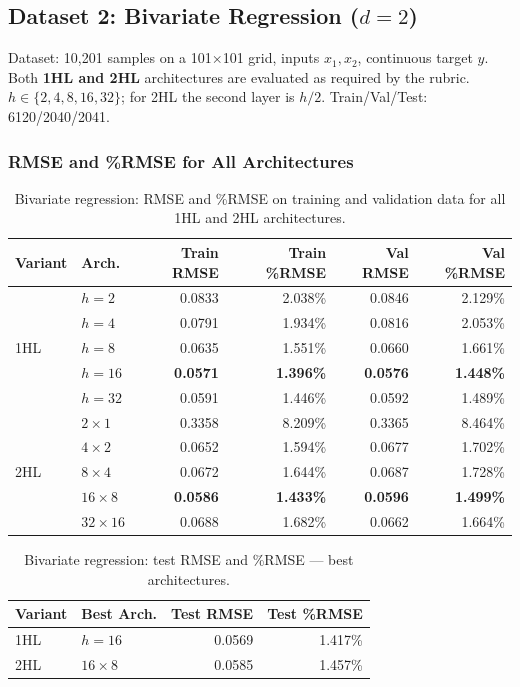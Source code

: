 \documentclass[11pt,a4paper]{article}
\begin{document}
\subsection{Dataset 2: Bivariate Regression ($d=2$)}

Dataset: 10,201 samples on a 101$\times$101 grid, inputs $x_1,x_2$, continuous target $y$. Both \textbf{1HL and 2HL} architectures are evaluated as required by the rubric. $h \in \{2,4,8,16,32\}$; for 2HL the second layer is $h/2$. Train/Val/Test: 6120/2040/2041.

\subsubsection*{RMSE and \%RMSE for All Architectures}

\begin{table}[H]
\centering
\caption{Bivariate regression: RMSE and \%RMSE on training and validation data for all 1HL and 2HL architectures.}
\label{tab:biv-trainval}
\small
\begin{tabular}{llrrrr}
\toprule
Variant & Arch. & Train RMSE & Train \%RMSE & Val RMSE & Val \%RMSE \\
\midrule
\multirow{5}{*}{1HL}
 & $h=2$   & 0.0833 & 2.038\% & 0.0846 & 2.129\% \\
 & $h=4$   & 0.0791 & 1.934\% & 0.0816 & 2.053\% \\
 & $h=8$   & 0.0635 & 1.551\% & 0.0660 & 1.661\% \\
 & \textbf{$h=16$} & \textbf{0.0571} & \textbf{1.396\%} & \textbf{0.0576} & \textbf{1.448\%} \\
 & $h=32$  & 0.0591 & 1.446\% & 0.0592 & 1.489\% \\
\midrule
\multirow{5}{*}{2HL}
 & $2\times1$   & 0.3358 & 8.209\% & 0.3365 & 8.464\% \\
 & $4\times2$   & 0.0652 & 1.594\% & 0.0677 & 1.702\% \\
 & $8\times4$   & 0.0672 & 1.644\% & 0.0687 & 1.728\% \\
 & \textbf{$16\times8$} & \textbf{0.0586} & \textbf{1.433\%} & \textbf{0.0596} & \textbf{1.499\%} \\
 & $32\times16$ & 0.0688 & 1.682\% & 0.0662 & 1.664\% \\
\bottomrule
\end{tabular}
\end{table}

\begin{table}[H]
\centering
\caption{Bivariate regression: test RMSE and \%RMSE --- best architectures.}
\label{tab:biv-test}
\begin{tabular}{llrr}
\toprule
Variant & Best Arch. & Test RMSE & Test \%RMSE \\
\midrule
1HL & $h=16$     & 0.0569 & 1.417\% \\
2HL & $16\times8$ & 0.0585 & 1.457\% \\
\bottomrule
\end{tabular}
\end{table}
\end{document}
